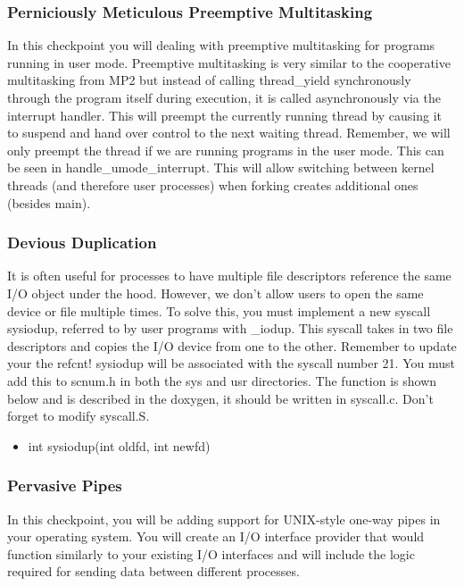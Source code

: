 \documentclass{article}
\begin{document}
	\subsubsection{Perniciously Meticulous Preemptive Multitasking} 
	In this checkpoint you will dealing with preemptive multitasking for programs running in user mode. Preemptive multitasking is very similar to the cooperative
    multitasking from MP2 but instead of calling {\fix thread\_yield} synchronously through the program itself during execution, it is called asynchronously via the interrupt handler. This will preempt the currently running thread by causing it to suspend and hand over control to the next waiting thread.
    Remember, we will only preempt the thread if we are running programs in the user mode. This can be seen in {\fix handle\_umode\_interrupt}. This will allow switching between kernel threads (and therefore user processes) when forking creates additional ones (besides {\fix main}).

	\subsubsection{Devious Duplication}
	It is often useful for processes to have multiple file descriptors reference the same I/O object under the hood. However, we don't allow users to open the same device
	or file multiple times. To solve this, you must implement a new syscall {\fix sysiodup}, referred to by user programs with {\fix \_iodup}. This syscall takes in two file descriptors and copies the I/O device from one to the other.
	Remember to update your the refcnt! {\fix sysiodup} will be associated with the syscall number 21. You must add this to {\fix scnum.h} in both the {\fix sys} and {\fix usr} directories. The function is shown below and is described in the doxygen,
	it should be written in {\fix syscall.c}. Don't forget to modify {\fix syscall.S}.

	\begin{itemize}
		\item {\fix int sysiodup(int oldfd, int newfd)}
	\end{itemize}
	
	\subsubsection{Pervasive Pipes} 
	In this checkpoint, you will be adding support for UNIX-style one-way pipes in your operating system. You will create an I/O interface provider that would function similarly to 
	your existing I/O interfaces and will include the logic required for sending data between different processes.
	
\end{document}
